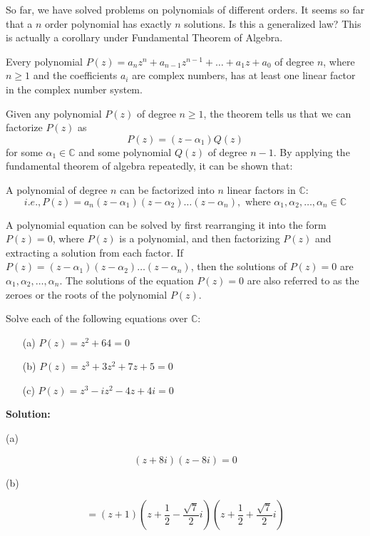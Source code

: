 \documentclass[
	12pt, %
	fleqn, %
	a4paper, %
]{LegrandOrangeBook}
\begin{document}
So far, we have solved problems on polynomials of different orders. It seems so far that a $n$ order
polynomial has exactly $n$ solutions. Is this a generalized law? This is actually a corollary under Fundamental Theorem of
Algebra.
\begin{theorem}
    Every polynomial \( P(z) = a_nz^n + a_{n-1}z^{n-1} + \ldots + a_1z + a_0 \) of degree \( n \), where \( n \geq 1 \) and the coefficients \( a_i \) are complex numbers, has at least one linear factor in the complex number system.
\end{theorem}
Given any polynomial \( P(z) \) of degree \( n \geq 1 \), the theorem tells us that we can factorize \( P(z) \) as
\[ P(z) = (z - \alpha_1)Q(z) \]
for some \( \alpha_1 \in \mathbb{C} \) and some polynomial \( Q(z) \) of degree \( n - 1 \).
By applying the fundamental theorem of algebra repeatedly, it can be shown that:
\begin{corollary}
    A polynomial of degree \( n \) can be factorized into \( n \) linear factors in \( \mathbb{C} \):
\[ i.e., P(z) = a_n(z - \alpha_1)(z - \alpha_2)\ldots(z - \alpha_n), \text{ where } \alpha_1, \alpha_2, \ldots, \alpha_n \in \mathbb{C} \]
\end{corollary}
A polynomial equation can be solved by first rearranging it into the form \( P(z) = 0 \), where \( P(z) \) is a polynomial, and then factorizing \( P(z) \) and extracting a solution from each factor.
If \( P(z) = (z - \alpha_1)(z - \alpha_2)\ldots(z - \alpha_n) \), then the solutions of \( P(z) = 0 \) are \( \alpha_1, \alpha_2, \ldots, \alpha_n \). The solutions of the equation \( P(z) = 0 \) are also referred to as the zeroes or the roots of the polynomial \( P(z) \).
\begin{example}
    Solve each of the following equations over \(\mathbb{C}\):
    \begin{itemize}
        \item[(a)] \( P(z) = z^2 + 64 = 0 \)
        \item[(b)] \( P(z) = z^3 + 3z^2 + 7z + 5 = 0 \)
        \item[(c)] \( P(z) = z^3 - iz^2 - 4z + 4i = 0 \)
    \end{itemize}
\end{example}
\textbf{Solution:}

(a)

\[
(z + 8i)(z - 8i) = 0
\]


(b)

\[
= (z + 1)\left(z + \frac{1}{2} - \frac{\sqrt{7}}{2}i\right)\left(z + \frac{1}{2} + \frac{\sqrt{7}}{2}i\right)
\]
\end{document}
